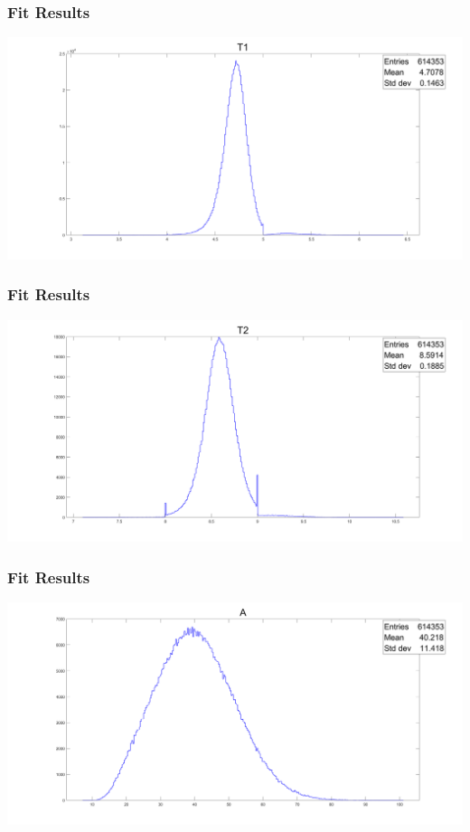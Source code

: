 \documentclass{beamer}
\begin{document}
\begin{frame}
    \frametitle{Fit Results}
    \centering
    \large
    \includegraphics[width=\textwidth]{h1.png}
\end{frame}
\begin{frame}
    \frametitle{Fit Results}
    \centering
    \large
    \includegraphics[width=\textwidth]{h2.png}
\end{frame}
\begin{frame}
    \frametitle{Fit Results}
    \centering
    \large
    \includegraphics[width=\textwidth]{h3.png}
\end{frame}
\end{document}

